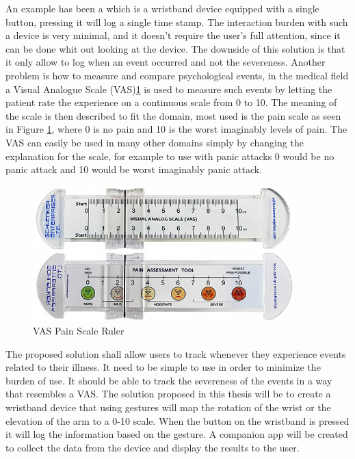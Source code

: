 An example has been a  which is a wristband device equipped with a single button, pressing it will log a single time stamp\cite{eg}. The interaction burden with such a device is very minimal, and it doesn't require the user's full attention, since it can be done whit out looking at the device. The downside of this solution is that it only allow to log when an event occurred and not the severeness. Another problem is how to measure and compare psychological events, in the medical field a Visual Analogue Scale (VAS)\ref{real_vas} is used to measure such events by letting the patient rate the experience on a continuous scale from 0 to 10. The meaning of the scale is then described to fit the domain, most used is the pain scale as seen in Figure \ref{real_vas}, where 0 is no pain and 10 is the worst imaginably levels of pain. The VAS can easily be used in many other domains simply by changing the explanation for the scale, for example to use with panic attacks 0 would be no panic attack and 10 would be worst imaginably panic attack.

\begin{figure}[h!]
    \centering
    \includegraphics[width=0.9\textwidth]{figures/real_vas.jpg}
    \caption{VAS Pain Scale Ruler\cite{real_vas}}
    \label{real_vas}
\end{figure}

The proposed solution shall allow users to track whenever they experience events related to their illness. It need to be simple to use in order to minimize the burden of use. It should be able to track the severeness of the events in a way that resembles a VAS. The solution proposed in this thesis will be to create a wristband device that using gestures will map the rotation of the wrist or the elevation of the arm to a 0-10 scale. When the button on the wristband is pressed it will log the information based on the gesture. A companion app will be created to collect the data from the device and display the results to the user.

